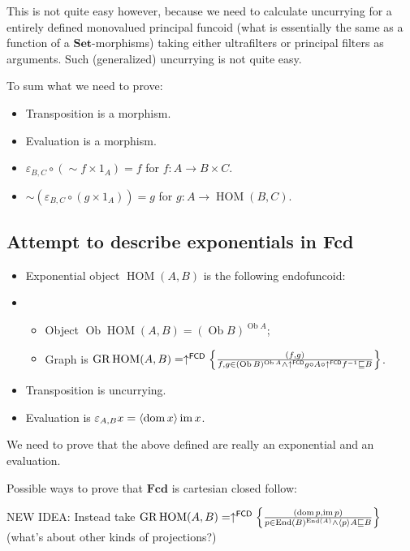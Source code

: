 This is not quite easy however, because we need to calculate uncurrying for a entirely defined monovalued principal funcoid (what is essentially the same as a function of a $\mathbf{Set}$-morphisms) taking either ultrafilters or principal filters as arguments. Such (generalized) uncurrying is not quite easy.

To sum what we need to prove:
\begin{itemize}
\item Transposition is a morphism.
\item Evaluation is a morphism.
\item $\varepsilon_{B,C} \circ ( \sim f \times 1_A) = f$ for $f : A \rightarrow B \times C$.
\item $\sim ( \varepsilon_{B,C} \circ ( g \times 1_A)) = g$ for $g : A \rightarrow \operatorname{HOM} ( B , C)$.
\end{itemize}

\subsection{Attempt to describe exponentials in Fcd}

\begin{itemize}
\item Exponential object $\operatorname{HOM}(A,B)$ is the following endofuncoid:
\item\begin{itemize}
\item Object $\operatorname{Ob}\operatorname{HOM}(A,B) = (\operatorname{Ob} B)^{\operatorname{Ob} A}$;
\item Graph is $\operatorname{GR} \operatorname{HOM} ( A , B) = \uparrow^{\mathsf{FCD}} \left\{ \frac{ ( f , g) }{ f, g \in (\operatorname{Ob}B)^{\operatorname{Ob} A} \wedge \uparrow^{\mathsf{FCD}}g \circ A \circ \uparrow^{\mathsf{FCD}}f^{- 1} \sqsubseteq B }\right\}$.
\end{itemize}
\item Transposition is uncurrying.
\item Evaluation is $\varepsilon_{A, B} x = \langle \operatorname{dom} x \rangle \operatorname{im} x$.
\end{itemize}

We need to prove that the above defined are really an exponential and an evaluation.

Possible ways to prove that $\mathbf{Fcd}$ is cartesian closed follow:

NEW IDEA: Instead take $\operatorname{GR}\operatorname{HOM}(A,B) =
\uparrow^{\mathsf{FCD}}\left\{ \frac{(\operatorname{dom} p,\operatorname{im} p)}{
p\in\operatorname{End}(B)^{\operatorname{End}(A)}\land\left\langle p\right\rangle A\sqsubseteq B}\right\}$ (what's about other
kinds of projections?)

